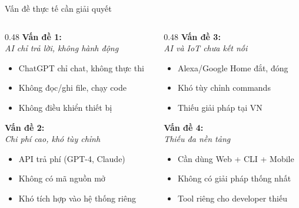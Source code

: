 \documentclass[aspectratio=169,12pt]{beamer}
\begin{document}
\begin{frame}{Vấn đề thực tế cần giải quyết}
    \begin{columns}[T]
        \begin{column}{0.48\textwidth}
            \textbf{\color{dangerred} Vấn đề 1:}\\
            \textit{AI chỉ trả lời, không hành động}
            \begin{itemize}
                \item ChatGPT chỉ chat, không thực thi
                \item Không đọc/ghi file, chạy code
                \item Không điều khiển thiết bị
            \end{itemize}

            \vspace{0.5cm}

            \textbf{\color{dangerred} Vấn đề 2:}\\
            \textit{Chi phí cao, khó tùy chỉnh}
            \begin{itemize}
                \item API trả phí (GPT-4, Claude)
                \item Không có mã nguồn mở
                \item Khó tích hợp vào hệ thống riêng
            \end{itemize}
        \end{column}
        \begin{column}{0.48\textwidth}
            \textbf{\color{dangerred} Vấn đề 3:}\\
            \textit{AI và IoT chưa kết nối}
            \begin{itemize}
                \item Alexa/Google Home đắt, đóng
                \item Khó tùy chỉnh commands
                \item Thiếu giải pháp tại VN
            \end{itemize}

            \vspace{0.5cm}

            \textbf{\color{dangerred} Vấn đề 4:}\\
            \textit{Thiếu đa nền tảng}
            \begin{itemize}
                \item Cần dùng Web + CLI + Mobile
                \item Không có giải pháp thống nhất
                \item Tool riêng cho developer thiếu
            \end{itemize}
        \end{column}
    \end{columns}
\end{frame}
\end{document}
